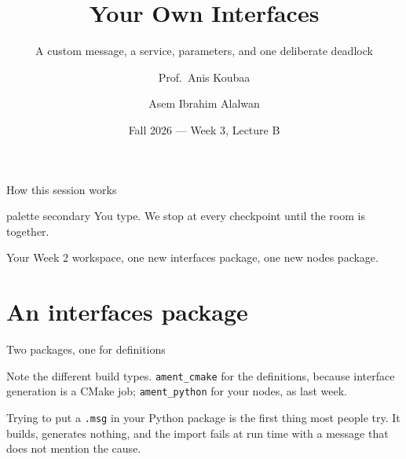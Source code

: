 \documentclass[aspectratio=169]{beamer}
\title[EE 414 --- Week 3B]{Your Own Interfaces}
\subtitle{A custom message, a service, parameters, and one deliberate deadlock}
\author[Koubaa \and Alalwan]{Prof.\ Anis Koubaa \and Asem Ibrahim Alalwan}
\institute[Alfaisal University]{
    EE 414 --- Introduction to Robotics\\
    College of Engineering\\
    Alfaisal University
}
\date{Fall 2026 --- Week 3, Lecture B}
\begin{document}
\begin{frame}[plain]
  \titlepage
\end{frame}

\begin{frame}{How this session works}
  \begin{beamercolorbox}[sep=8pt,center,rounded=true]{palette secondary}
    \small You type. We stop at every checkpoint until the room is together.
  \end{beamercolorbox}

  \vspace{0.8em}
  {\scriptsize\tableofcontents[hideallsubsections]}

  \vspace{0.4em}
  \centering\footnotesize
  Your Week 2 workspace, one new interfaces package, one new nodes package.
\end{frame}

\section{An interfaces package}

\begin{frame}[fragile]{Two packages, one for definitions}

  \vspace{0.5em}
  \small
  Note the different build types. \texttt{ament\_cmake} for the definitions, because interface
  generation is a CMake job; \texttt{ament\_python} for your nodes, as last week.

  \vspace{0.4em}
  \begin{underhood}
    \footnotesize
    Trying to put a \texttt{.msg} in your Python package is the first thing most people try.
    It builds, generates nothing, and the import fails at run time with a message that does
    not mention the cause.
  \end{underhood}
\end{frame}
\end{document}
